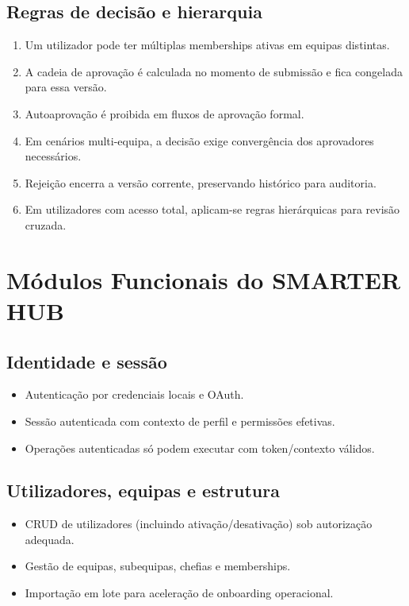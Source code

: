 \documentclass[11pt,a4paper,twoside]{article}
\begin{document}
\subsection{Regras de decisão e hierarquia}
\begin{enumerate}
  \item Um utilizador pode ter múltiplas memberships ativas em equipas distintas.
  \item A cadeia de aprovação é calculada no momento de submissão e fica congelada para essa versão.
  \item Autoaprovação é proibida em fluxos de aprovação formal.
  \item Em cenários multi-equipa, a decisão exige convergência dos aprovadores necessários.
  \item Rejeição encerra a versão corrente, preservando histórico para auditoria.
  \item Em utilizadores com acesso total, aplicam-se regras hierárquicas para revisão cruzada.
\end{enumerate}

\section{Módulos Funcionais do SMARTER HUB}

\subsection{Identidade e sessão}
\begin{itemize}
  \item Autenticação por credenciais locais e OAuth.
  \item Sessão autenticada com contexto de perfil e permissões efetivas.
  \item Operações autenticadas só podem executar com token/contexto válidos.
\end{itemize}

\subsection{Utilizadores, equipas e estrutura}
\begin{itemize}
  \item CRUD de utilizadores (incluindo ativação/desativação) sob autorização adequada.
  \item Gestão de equipas, subequipas, chefias e memberships.
  \item Importação em lote para aceleração de onboarding operacional.
\end{itemize}
\end{document}
